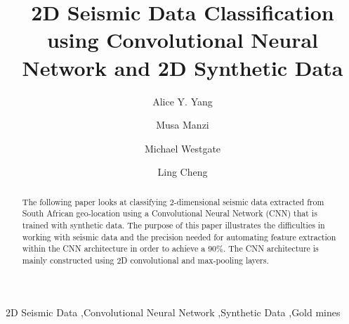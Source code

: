 \documentclass[preprint,12pt]{elsarticle}
\begin{document}
\begin{frontmatter}


    \title{2D Seismic Data Classification using Convolutional Neural Network and 2D Synthetic Data}




    \author[label1]{Alice Y. Yang}
    \author[label2]{Musa Manzi}
    \author[label2]{Michael Westgate}
    \author[label2]{Ling Cheng}

    \address[label1]{Cape Town, South Africa}
    \address[label2]{Johannesburg, South Africa}

    \begin{abstract}
        The following paper looks at classifying 2-dimensional seismic data extracted
        from South African geo-location using a Convolutional Neural Network (CNN)
        that is trained with synthetic data. The purpose of this paper illustrates the
        difficulties in working with seismic data and the precision needed for automating
        feature extraction within the CNN architecture in order to achieve
        a 90\%. The CNN architecture is mainly constructed using 2D convolutional
        and max-pooling layers.
    \end{abstract}

    \begin{keyword}
        2D Seismic Data \sep Convolutional Neural Network \sep Synthetic Data \sep Gold mines


    \end{keyword}

\end{frontmatter}
\end{document}
